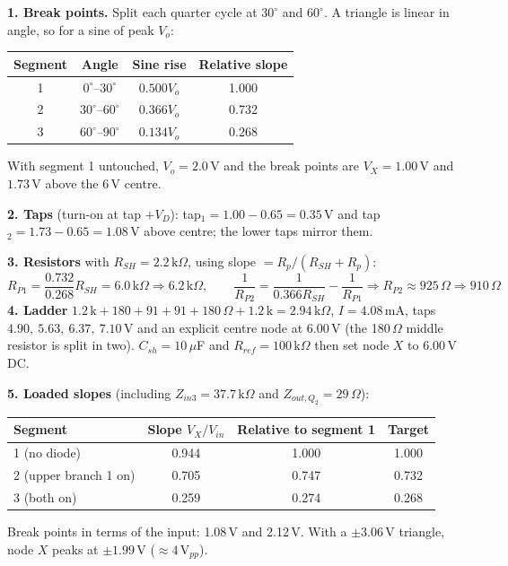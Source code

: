 \begin{tcolorbox}[colback=blue!3,colframe=blue!40!black,title=Calculations,fonttitle=\small\bfseries,boxrule=0.4pt]
\small
\textbf{1. Break points.} Split each quarter cycle at $30^\circ$ and $60^\circ$. A triangle is linear in angle, so for a sine of peak $V_o$:
\begin{center}
\begin{tabular}{@{}cccc@{}}
\toprule
Segment & Angle & Sine rise & Relative slope \\
\midrule
1 & $0^\circ$--$30^\circ$ & $0.500V_o$ & 1.000 \\
2 & $30^\circ$--$60^\circ$ & $0.366V_o$ & 0.732 \\
3 & $60^\circ$--$90^\circ$ & $0.134V_o$ & 0.268 \\
\bottomrule
\end{tabular}
\end{center}
With segment 1 untouched, $V_o=2.0$\,V and the break points are $V_X=1.00$\,V and $1.73$\,V above the 6\,V centre.

\textbf{2. Taps} (turn-on at tap $+V_D$): tap$_1=1.00-0.65=0.35$\,V and tap$_2=1.73-0.65=1.08$\,V above centre; the lower taps mirror them.

\textbf{3. Resistors} with $R_{SH}=2.2\,\mathrm{k}\Omega$, using slope $=R_p/(R_{SH}+R_p)$:
\[
R_{P1}=\frac{0.732}{0.268}R_{SH}=6.0\,\mathrm{k}\Omega\Rightarrow6.2\,\mathrm{k}\Omega,\qquad
\frac1{R_{P2}}=\frac{1}{0.366R_{SH}}-\frac1{R_{P1}}\Rightarrow R_{P2}\approx925\,\Omega\Rightarrow910\,\Omega
\]
\textbf{4. Ladder} $1.2\,\mathrm k+180+91+91+180\,\Omega+1.2\,\mathrm k=2.94\,\mathrm{k}\Omega$, $I=4.08$\,mA, taps $4.90,\ 5.63,\ 6.37,\ 7.10$\,V and an explicit centre node at 6.00\,V (the 180\,$\Omega$ middle resistor is split in two). $C_{sh}=10\,\mu$F and $R_{ref}=100\,\mathrm{k}\Omega$ then set node $X$ to 6.00\,V DC.

\textbf{5. Loaded slopes} (including $Z_{in3}=37.7\,\mathrm k\Omega$ and $Z_{out,Q_2}=29\,\Omega$):
\begin{center}
\begin{tabular}{@{}lccc@{}}
\toprule
Segment & Slope $V_X/V_{in}$ & Relative to segment 1 & Target \\
\midrule
1 (no diode) & 0.944 & 1.000 & 1.000 \\
2 (upper branch 1 on) & 0.705 & 0.747 & 0.732 \\
3 (both on) & 0.259 & 0.274 & 0.268 \\
\bottomrule
\end{tabular}
\end{center}
Break points in terms of the input: 1.08\,V and 2.12\,V. With a $\pm3.06$\,V triangle, node $X$ peaks at $\pm1.99$\,V ($\approx4$\,V$_{pp}$).
\end{tcolorbox}

